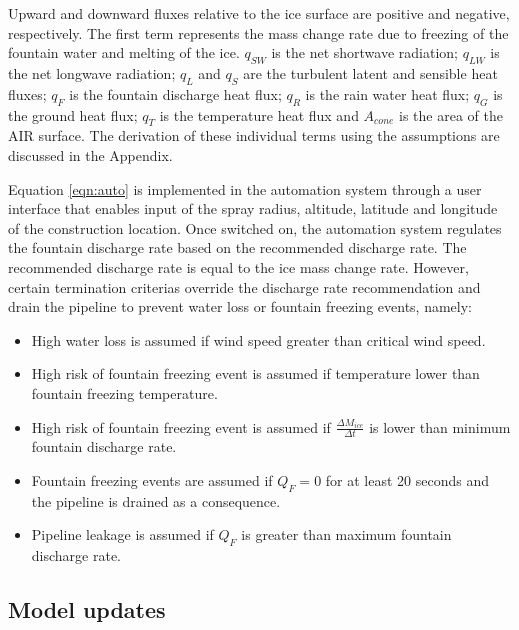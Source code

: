 \documentclass[tc, manuscript]{copernicus}
\begin{document}
Upward and downward fluxes relative to the ice surface are positive and negative, respectively. The first term
represents the mass change rate due to freezing of the fountain water and melting of the ice. $q_{SW}$ is the
net shortwave radiation; $q_{LW}$ is the net longwave radiation; $q_{L}$ and $q_{S}$ are the turbulent latent
and sensible heat fluxes; $q_{F}$ is the fountain discharge heat flux; $q_{R}$ is the rain water heat
flux; $q_{G}$ is the ground heat flux; $q_{T}$ is the temperature heat flux and $A_{cone}$ is the area of the
AIR surface. The derivation of these individual terms using the assumptions are discussed in the Appendix.

Equation \ref{eqn:auto} is implemented in the automation system through a user interface that enables input of
the spray radius, altitude, latitude and longitude of the construction location. Once switched on, the
automation system regulates the fountain discharge rate based on the recommended discharge rate. The recommended
discharge rate is equal to the ice mass change rate. However, certain termination criterias override the
discharge rate recommendation and drain the pipeline to prevent water loss or fountain freezing events, namely: 

\begin{itemize}

\item High water loss is assumed if wind speed greater than critical wind speed.

\item High risk of fountain freezing event is assumed if temperature lower than fountain freezing temperature.

\item High risk of fountain freezing event is assumed if $\frac{\Delta M_{ice}}{\Delta t}$ is lower than minimum fountain discharge rate. 

\item Fountain freezing events are assumed if $Q_F = 0$ for at least 20 seconds and the pipeline is drained as a
  consequence.

\item Pipeline leakage is assumed if $Q_F$ is greater than maximum fountain discharge rate.

\end{itemize}

\subsection{Model updates}
\end{document}
